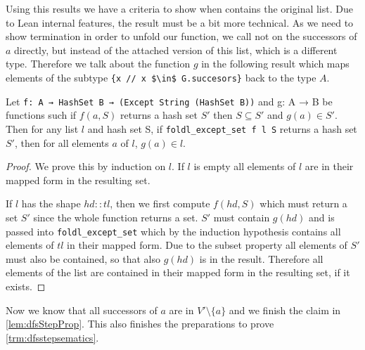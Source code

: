 Using this results we have a criteria to show when \foldlexceptset contains the original list. Due to Lean internal features, the result must be a bit more technical. As we need to show termination in order to unfold our function, we call \foldlexceptset not on the successors of $a$ directly, but instead of the attached version of this list, which is a different type. Therefore we talk about the function $g$ in the following result which maps elements of the subtype \lstinline|{x // x $\in$ G.succesors}| back to the type $A$. 

\begin{lemma}[\foldlexceptsetcontainslistmap]
    Let \texttt{f: A → HashSet B → (Except String (HashSet B))} and {g: A → B} be functions such if $f(a,S) $ returns a hash set $S'$  then $S \subseteq S'$ and $g(a) \in S'$. Then for any list $l$ and hash set S,  if \texttt{foldl\_except\_set f l S} returns a hash set $S'$, then for all elements $a$ of $l$, $g(a) \in l$.
\end{lemma}
\begin{proof}
    We prove this by induction on $l$.
    If $l$ is empty all elements of $l$ are in their mapped form in the resulting set.

    If $l$ has the shape $hd::tl$, then we first compute $f(hd,S)$ which must return a set $S'$ since the whole function returns a set. $S'$ must contain $g(hd)$ and is passed into \texttt{foldl\_except\_set} which by the induction hypothesis contains all elements of $tl$ in their mapped form. Due to the subset property all elements of $S'$ must also be contained, so that also $g(hd)$ is in the result. Therefore all elements of the list are contained in their mapped form in the resulting set, if it exists.
\end{proof}

Now we know that all successors of $a$ are in $V'\setminus\{a\}$ and we finish the claim in \cref{lem:dfsStepProp}. This also finishes the preparations to prove \cref{trm:dfsstepsematics}.

